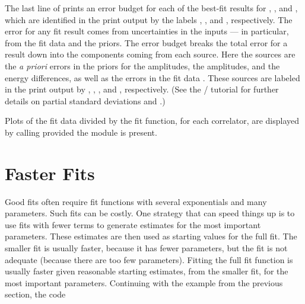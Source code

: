 \documentclass[letterpaper,10pt,english]{sphinxmanual}
\begin{document}
The last line of  prints an error budget for
each of the best-fit results for , ,  and
, which are identified in the print output by the labels
, ,  and , respectively. The error for any
fit result comes from uncertainties in the inputs --- in particular, from the
fit data and the priors. The error budget breaks the total error for a
result down into the components coming from each source. Here the sources are
the \emph{a priori} errors in the priors for the  amplitudes, the 
amplitudes, and the  energy differences, as well as the errors in
the fit data . These sources are labeled in the print output by
, , , and , respectively. (See the
/ tutorial for further details on partial standard
deviations and .)

Plots of the fit data divided by the fit function, for each correlator, are
displayed by calling  provided the 
module is present.


\section{Faster Fits}
\label{corrfitter:faster-fits}\label{corrfitter:id1}
Good fits often require fit functions with several exponentials and many
parameters. Such fits can be costly. One strategy that can speed things up is
to use fits with fewer terms to generate estimates for the most important
parameters. These estimates are then used as starting values for the full
fit. The smaller fit is usually faster, because it has fewer parameters, but
the fit is not adequate (because there are too few parameters). Fitting the
full fit function is usually faster given reasonable starting estimates, from
the smaller fit, for the most important parameters. Continuing with the
example from the previous section, the code
\end{document}
